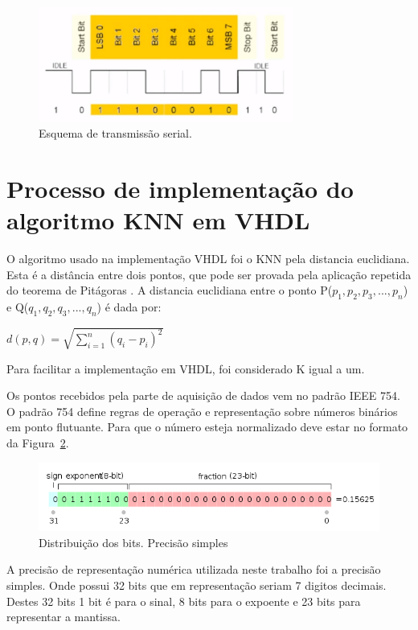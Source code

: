 \documentclass[12pt]{article}
\begin{document}
\begin{figure}[!h]
\centering
\includegraphics[width=3.3in]{img/uart.png}
\caption{Esquema de transmissão serial.}
\label{simulacao}
\end{figure}

\section{Processo de implementação do algoritmo KNN em VHDL}

O algoritmo usado na implementação VHDL foi o KNN pela distancia euclidiana. 
Esta é a distância entre dois pontos, que pode ser provada pela aplicação
repetida do teorema de Pitágoras \cite{wiki:ieee754en}. A distancia euclidiana
entre o ponto P($p_1, p_2, p_3, ..., p_n$) e Q($q_1, q_2, q_3, ..., q_n$) é
dada por:

$d(p, q) = \sqrt{\sum\limits_{i=1}^n (q_i - p_i)^2}$

Para facilitar a implementação em VHDL, foi considerado K igual a um. 

Os pontos recebidos pela parte de aquisição de dados vem no padrão IEEE 754. O
padrão 754 define regras de operação e representação sobre números binários em
ponto flutuante. Para que o número esteja normalizado deve estar no formato da
Figura~\ref{fig:ieee754ps}.

\begin{figure}[h]
\centering
\includegraphics[width=.5\textwidth]{img/IEEE_754_Single_Floating_Point_Format}
\caption{Distribuição dos bits. Precisão simples \cite{wiki:ieee754en}}
\label{fig:ieee754ps}
\end{figure}

A precisão de representação numérica utilizada neste trabalho foi a precisão 
simples. Onde possui 32 bits que em representação seriam 7 digitos decimais.
Destes 32 bits 1 bit é para o sinal, 8 bits para o expoente e 23 bits para 
representar a mantissa.
\end{document}
